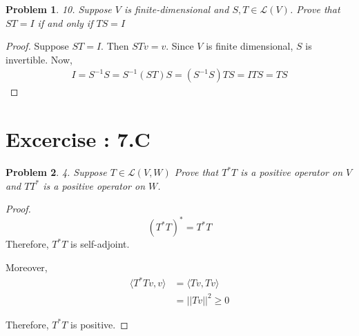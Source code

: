 \documentclass[12pt]{book}
\newtheorem*{problem*}{Problem}
\newcommand{\LL}{\mathcal{L}}
\begin{document}
\begin{problem*}10. Suppose $V$ is finite-dimensional and $S, T \in \LL(V)$. Prove that $ST = I$ if and only if $TS = I$\end{problem*}

\begin{proof}
  Suppose $ST = I$. Then $STv = v$. Since $V$ is finite dimensional, $S$ is invertible. Now,
  \begin{align*}
    I = S^{-1}S = S^{-1}(ST)S = (S^{-1}S)TS = ITS = TS
  \end{align*}
\end{proof}


\section{Excercise : 7.C}

\begin{problem*}
4. Suppose $T \in \LL(V,W)$ Prove that $T^*T$ is a positive operator on $V$ and $TT^*$ is a positive operator on $W$. 
\end{problem*}

\begin{proof}
  \[
  (T^{*}T)^* = T^*T
  \]
  Therefore, $T^{*}T$ is self-adjoint.

  Moreover,
  \begin{align*}
    \langle T^{*}Tv, v \rangle & = \langle Tv, Tv \rangle\\
    & = ||Tv||^2 \ge 0
  \end{align*}

Therefore, $T^{*}T$ is positive. 
\end{proof}

\end{document}
